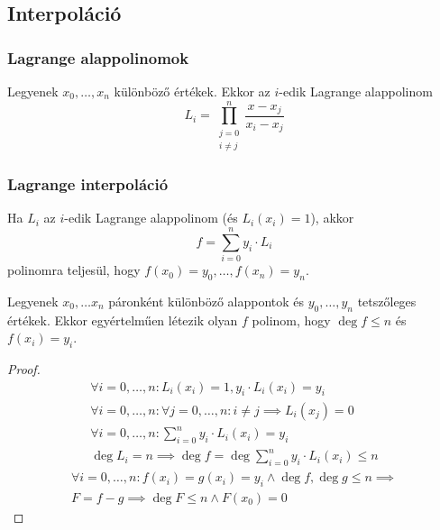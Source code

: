 \setcounter{definition}{0}
\setcounter{theorem}{0}
\subsection{Interpoláció}
\subsubsection{Lagrange alappolinomok}
\begin{definition}
	Legyenek $x_0, \dots, x_n$ különböző értékek.
	Ekkor az $i$-edik Lagrange alappolinom
	\begin{equation*}
		L_i = \prod_{\substack{j = 0 \\ i \neq j}}^n \frac{x - x_j}{x_i - x_j}
	\end{equation*}
\end{definition}
\subsubsection{Lagrange interpoláció}
\begin{theorem}
	Ha $L_i$ az $i$-edik Lagrange alappolinom (és $L_i(x_i) = 1$), akkor
	\begin{equation*}
		f = \sum_{i = 0}^n y_i \cdot L_i
	\end{equation*}
	polinomra teljesül, hogy $f(x_0) = y_0, \dots, f(x_n) = y_n$.
\end{theorem}
\begin{theorem}
	Legyenek $x_0, \dots x_n$ páronként különböző alappontok és
	$y_0, \dots, y_n$ tetszőleges értékek.
	Ekkor egyértelműen létezik olyan $f$ polinom,
	hogy $\deg f \leq n$ és $f(x_i) = y_i$.
\end{theorem}
\begin{proof}
	\begin{gather*}
		\forall i = 0, \dots, n: L_i(x_i) = 1, y_i \cdot L_i(x_i) = y_i \\
		\forall i = 0, \dots, n: \forall j = 0, \dots, n: i \neq j \implies
		L_i(x_j) = 0 \\
		\forall i = 0, \dots, n: \sum_{i = 0}^n y_i \cdot L_i(x_i) = y_i \\
		\deg L_i = n \implies \deg f =
		\deg \sum_{i = 0}^n y_i \cdot L_i(x_i) \leq n
	\end{gather*}
	\begin{multline*}
		\forall i = 0, \dots, n: f(x_i) = g(x_i) = y_i \land
		\deg f, \deg g \leq n \implies \\
		F = f - g \implies \deg F \leq n \land F(x_0) = 0
		\tag{Ellentmondás, mert ha $F$-nek $x_0$ gyöke, akkor $n + 1$ gyöke van}
	\end{multline*}
\end{proof}
